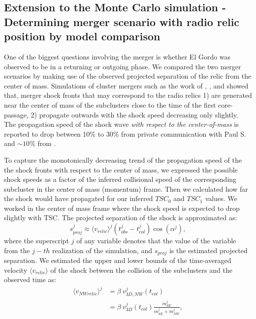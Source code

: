 
\subsection{Extension to the Monte Carlo simulation - Determining merger
scenario with radio relic position by model comparison}

One of the biggest questions involving the merger is whether El Gordo was
observed to be in a returning or outgoing phase. We compared the two merger
scenarios by making use of the observed projected separation of the relic from the
center of mass.
Simulations of cluster mergers such as the work of \citet{Paul2011b},
\citet{VanWeerenRJ2011}, and \citet{Springel2007} showed that, merger shock
fronts that may correspond to the radio relics 1) are generated near the
center of mass of the subclusters close to the time of the first
core-passage, 2) propagate outwards with the shock speed decreasing only slightly.
The propagation speed of the shock wave {\it with respect to the
center-of-mass} is reported to drop between 10\% to
30\% from private communication with Paul S. and $\sim 10\%$ from
\citet{Springel2007}. \par 
To capture the monotonically decreasing trend of the
propagation speed of the the shock fronts with respect to the center of
mass, we expressed the possible shock speeds as a factor of the inferred
collisional speed of the corresponding subcluster in the center of mass
(momentum) frame. 
Then we calculated how far the shock would have propagated for our inferred
$TSC_0$ and $TSC_1$ values. We worked in the center of mass frame where the
shock speed is expected to drop slightly with TSC. 
The projected separation of the shock is approximated as:
\begin{equation}
	s^j_{proj} \approx \langle v_{relic} \rangle^j (t^j_{obs} - t^j_{col})
	\cos(\alpha^j),
	\label{eq:proj_s_model}
\end{equation}
where the superscript $j$ of any variable denotes that the value of the
variable from the $j-th$ realization of the simulation, and $s_{proj}$ is the estimated projected
separation. We estimated the upper and lower bounds of the time-averaged velocity
$\langle v_{relic} \rangle$ of the shock between
the collision of the subclusters and the observed time as:  
\begin{align}
	\label{eqn:NW_speed}
	\langle v_{NW relic} \rangle^j &= \beta~v^j_{3D, NW}(t_{col}) \\
	&= \beta~v^j_{3D}(t_{col}) \frac{m^j_{SE}}{m^j_{SE} + m^j_{NW}}, 
\end{align}

